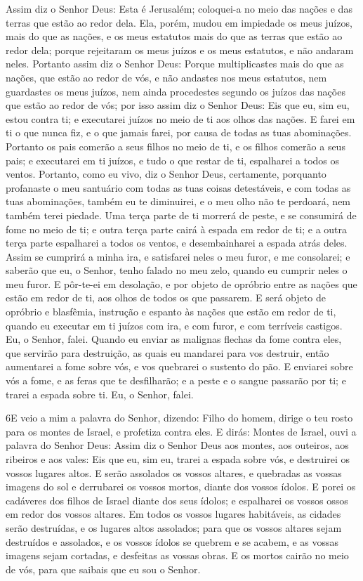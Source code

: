 Assim diz o Senhor Deus: Esta é Jerusalém; coloquei-a no meio das
nações e das terras que estão ao redor dela. Ela, porém, mudou
em impiedade os meus juízos, mais do que as nações, e os meus
estatutos mais do que as terras que estão ao redor dela; porque
rejeitaram os meus juízos e os meus estatutos, e não andaram neles.
Portanto assim diz o Senhor Deus: Porque multiplicastes mais do
que as nações, que estão ao redor de vós, e não andastes nos meus
estatutos, nem guardastes os meus juízos, nem ainda procedestes
segundo os juízos das nações que estão ao redor de vós; por isso
assim diz o Senhor Deus: Eis que eu, sim eu, estou contra ti; e
executarei juízos no meio de ti aos olhos das nações. E farei em
ti o que nunca fiz, e o que jamais farei, por causa de todas as tuas
abominações. Portanto os pais comerão a seus filhos no meio
de ti, e os filhos comerão a seus pais; e executarei em ti juízos, e
tudo o que restar de ti, espalharei a todos os ventos.
Portanto, como eu vivo, diz o Senhor Deus, certamente,
porquanto profanaste o meu santuário com todas as tuas coisas
detestáveis, e com todas as tuas abominações, também eu te
diminuirei, e o meu olho não te perdoará, nem também terei piedade.
Uma terça parte de ti morrerá de peste, e se consumirá de
fome no meio de ti; e outra terça parte cairá à espada em redor de
ti; e a outra terça parte espalharei a todos os ventos, e
desembainharei a espada atrás deles. Assim se cumprirá a
minha ira, e satisfarei neles o meu furor, e me consolarei; e
saberão que eu, o Senhor, tenho falado no meu zelo, quando eu
cumprir neles o meu furor. E pôr-te-ei em desolação, e por
objeto de opróbrio entre as nações que estão em redor de ti, aos
olhos de todos os que passarem. E será objeto de opróbrio e
blasfêmia, instrução e espanto às nações que estão em redor de ti,
quando eu executar em ti juízos com ira, e com furor, e com
terríveis castigos. Eu, o Senhor, falei. Quando eu enviar as
malignas flechas da fome contra eles, que servirão para destruição,
as quais eu mandarei para vos destruir, então aumentarei a fome
sobre vós, e vos quebrarei o sustento do pão. E enviarei
sobre vós a fome, e as feras que te desfilharão; e a peste e o
sangue passarão por ti; e trarei a espada sobre ti. Eu, o Senhor,
falei.

\medskip

\lettrine{6} E veio a mim a palavra do Senhor, dizendo:
Filho do homem, dirige o teu rosto para os montes de Israel, e
profetiza contra eles. E dirás: Montes de Israel, ouvi a palavra
do Senhor Deus: Assim diz o Senhor Deus aos montes, aos outeiros,
aos ribeiros e aos vales: Eis que eu, sim eu, trarei a espada sobre
vós, e destruirei os vossos lugares altos. E serão assolados os
vossos altares, e quebradas as vossas imagens do sol e derrubarei os
vossos mortos, diante dos vossos ídolos. E porei os cadáveres
dos filhos de Israel diante dos seus ídolos; e espalharei os vossos
ossos em redor dos vossos altares. Em todos os vossos lugares
habitáveis, as cidades serão destruídas, e os lugares altos
assolados; para que os vossos altares sejam destruídos e assolados,
e os vossos ídolos se quebrem e se acabem, e as vossas imagens sejam
cortadas, e desfeitas as vossas obras. E os mortos cairão no
meio de vós, para que saibais que eu sou o Senhor.

